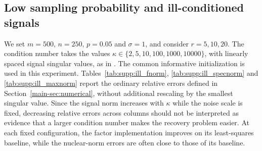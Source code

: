 \documentclass[numsec,webpdf,modern,large,namedate]{oup-authoring-template}
\theoremstyle{plain}
\theoremstyle{remark}
\newif\ifmarkchanges
\newenvironment{revision}{\begingroup\ifmarkchanges\color{red}\fi}{\endgroup}
\begin{document}
\begin{revision}
\subsection{Low sampling probability and ill-conditioned signals}
We set $m=500$, $n=250$, $p=0.05$ and $\sigma=1$, and consider $r=5,10,20$. The condition number takes the values $\kappa\in\{2,5,10,100,1000,10000\}$, with linearly spaced signal singular values, as in \cite{kummerle2021scalable}. The common informative initialization is used in this experiment.
Tables~\ref{tab:supp:ill_fnorm}, \ref{tab:supp:ill_specnorm} and \ref{tab:supp:ill_maxnorm} report the ordinary relative errors defined in Section~\ref{main-sec:numerical}, without additional rescaling by the smallest singular value. Since the signal norm increases with $\kappa$ while the noise scale is fixed, decreasing relative errors across columns should not be interpreted as evidence that a larger condition number makes the recovery problem easier. At each fixed configuration, the factor implementation improves on its least-squares baseline, while the nuclear-norm errors are often close to those of its baseline.

\end{revision}
\end{document}
